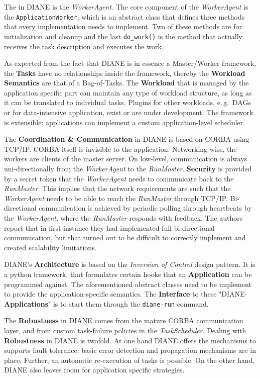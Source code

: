 \documentclass{sig-alternate}
\begin{document}
The \pilot in DIANE is the \textit{WorkerAgent}.
The core component of the \textit{WorkerAgent} is the
\texttt{ApplicationWorker}, which is an abstract class that defines three
methods that every implementation needs to implement.
Two of these methods are for initialization and cleanup and the last
\texttt{do\_work()} is the method that actually receives the task description
and executes the work.

As expected from the fact that DIANE is in essence a Master/Worker framework,
the \textbf{Tasks} have no relationships inside the framework, thereby
the \textbf{Workload Semantics} are that of a Bag-of-Tasks.
The \textbf{Workload} that is managed by the application specific part can
maintain any type of workload structure, as long as it can be translated to
individual tasks\cite{diane-dag, diane-etc}.
Plugins for other workloads, e.\,g.\ DAGs or for data-intensive
application, exist or are under development. The framework is extensible:
applications can implement a custom application-level scheduler.

The \textbf{Coordination \& Communication} in DIANE is based on CORBA using
TCP/IP.
CORBA itself is invisible to the application.
Networking-wise, the workers are clients of the master server.
On low-level, communication is always uni-directionally from the
\textit{WorkerAgent} to the \textit{RunMaster}.
\textbf{Security} is provided by a secret token that the \textit{WorkerAgent}
needs to communicate back to the \textit{RunMaster}.
This implies that the network requirements are such that the
\textit{WorkerAgent} needs to be able to reach the \textit{RunMaster} through
TCP/IP.
Bi-directional communication is achieved by periodic polling through
heartbeats by the \textit{WorkerAgent}, where the \textit{RunMaster} responds
with feedback.
The authors report that in first instance they had implemented full
bi-directional communication, but that turned out to be difficult to correctly
implement and created scalability limitations.

DIANE's \textbf{Architecture} is based on the \textit{Inversion of Control}
design pattern.
It is a python framework, that formulates certain hooks that an
\textbf{Application} can be programmed against. The aforementioned abstract
classes need to be implement to provide the application-specific semantics.
The \textbf{Interface} to these "DIANE-\textbf{Applications}" is to start them
through the \texttt{diane-run} command.

The \textbf{Robustness} in DIANE comes from the mature CORBA communication
layer, and from custom task-failure policies in the \textit{TaskScheduler}.
Dealing with \textbf{Robustness} in DIANE is twofold.
At one hand DIANE offers the mechanisms to supports fault tolerance: basic
error detection and propagation mechanisms are in place.
Further, an automatic re-execution of tasks is possible.
On the other hand, DIANE also leaves room for application specific strategies.
\end{document}
